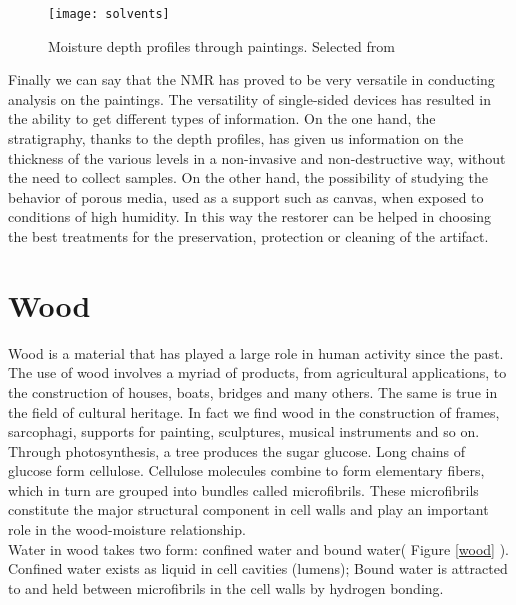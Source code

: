 \documentclass[a4paper,11pt]{report}
\begin{document}
\begin{figure}[h]
	\centering
	\texttt{[image: solvents]}
	\caption{Moisture depth profiles through paintings. Selected from \cite{exseifresco}}\label{solvents}
\end{figure}

Finally we can say that the NMR has proved to be very versatile in conducting analysis on the paintings. The versatility of single-sided devices has resulted in the ability to get different types of information. On the one hand, the stratigraphy, thanks to the depth profiles, has given us information on the thickness of the various levels in a non-invasive and non-destructive way, without the need to collect samples. On the other hand, the possibility of studying the behavior of porous media, used as a support such as canvas, when exposed to conditions of high humidity. In this way the restorer can be helped in choosing the best treatments for the preservation, protection or cleaning of the artifact.






\section{Wood}

Wood is a material that has played a large role in human activity since the past. The use of wood involves a myriad of products, from agricultural applications, to the construction of houses, boats, bridges and many others. The same is true in the field of cultural heritage. In fact we find wood in the construction of frames, sarcophagi, supports for painting, sculptures, musical instruments and so on.\\
Through photosynthesis, a tree produces the sugar glucose. Long chains of glucose form cellulose. Cellulose molecules combine to form elementary fibers, which in turn are grouped into bundles called microfibrils. These microfibrils constitute the major structural component in cell walls and play an important role in the wood-moisture relationship\cite{duewood}.\\
Water in wood takes two form: confined water and bound water( Figure \ref{wood} ). Confined water exists as liquid in cell cavities (lumens); Bound water is attracted to and held between microfibrils in the cell walls by hydrogen bonding\cite{duewood}.
\end{document}
